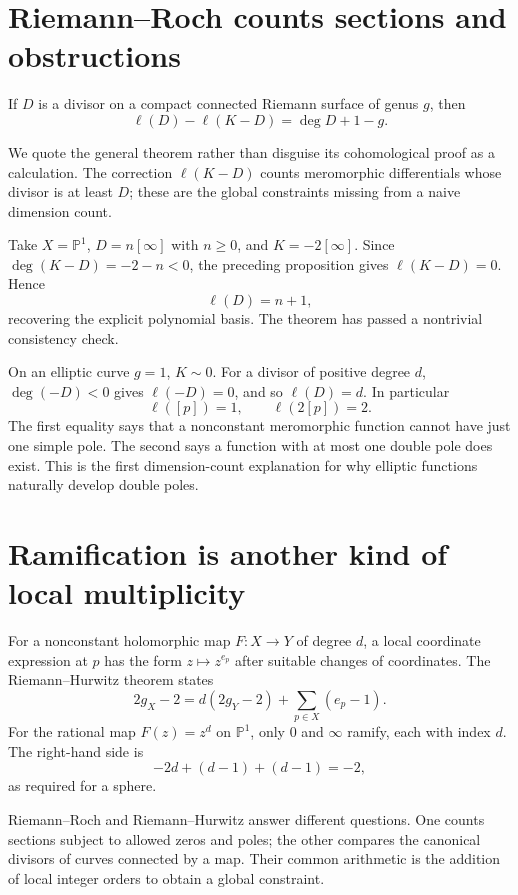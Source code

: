 \section{Riemann--Roch counts sections and obstructions}

\begin{theorem}
If \(D\) is a divisor on a compact connected Riemann surface of genus \(g\), then
\[
 \ell(D)-\ell(K-D)=\deg D+1-g.
\]
\end{theorem}
We quote the general theorem rather than disguise its cohomological proof as a calculation. The correction \(\ell(K-D)\) counts meromorphic differentials whose divisor is at least \(D\); these are the global constraints missing from a naive dimension count.

Take \(X=\mathbb P^1\), \(D=n[\infty]\) with \(n\ge0\), and \(K=-2[\infty]\). Since \(\deg(K-D)=-2-n<0\), the preceding proposition gives \(\ell(K-D)=0\). Hence
\[
 \ell(D)=n+1,
\]
recovering the explicit polynomial basis. The theorem has passed a nontrivial consistency check.

On an elliptic curve \(g=1\), \(K\sim0\). For a divisor of positive degree \(d\), \(\deg(-D)<0\) gives \(\ell(-D)=0\), and so \(\ell(D)=d\). In particular
\[
 \ell([p])=1,\qquad \ell(2[p])=2.
\]
The first equality says that a nonconstant meromorphic function cannot have just one simple pole. The second says a function with at most one double pole does exist. This is the first dimension-count explanation for why elliptic functions naturally develop double poles.

\section{Ramification is another kind of local multiplicity}

For a nonconstant holomorphic map \(F:X\to Y\) of degree \(d\), a local coordinate expression at \(p\) has the form \(z\mapsto z^{e_p}\) after suitable changes of coordinates. The Riemann--Hurwitz theorem states
\[
 2g_X-2=d(2g_Y-2)+\sum_{p\in X}(e_p-1).
\]
For the rational map \(F(z)=z^d\) on \(\mathbb P^1\), only \(0\) and \(\infty\) ramify, each with index \(d\). The right-hand side is
\[
 -2d+(d-1)+(d-1)=-2,
\]
as required for a sphere.

Riemann--Roch and Riemann--Hurwitz answer different questions. One counts sections subject to allowed zeros and poles; the other compares the canonical divisors of curves connected by a map. Their common arithmetic is the addition of local integer orders to obtain a global constraint.
